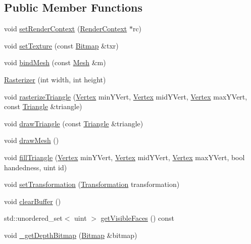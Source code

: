 \subsection*{Public Member Functions}
\begin{DoxyCompactItemize}
\item 
void \hyperlink{class_rasterizer_accac2d0878675f9fe01ae2fedd30f84f}{set\+Render\+Context} (\hyperlink{class_render_context}{Render\+Context} $\ast$rc)
\item 
void \hyperlink{class_rasterizer_a401966b0d0572d8c944e6b319515ac5e}{set\+Texture} (const \hyperlink{class_bitmap}{Bitmap} \&txr)
\item 
void \hyperlink{class_rasterizer_a4e43391ca21604f52d4baabc44b34933}{bind\+Mesh} (const \hyperlink{class_mesh}{Mesh} \&m)
\item 
\hyperlink{class_rasterizer_a2eec0e17ef479f0e0af5640d6786e077}{Rasterizer} (int width, int height)
\item 
void \hyperlink{class_rasterizer_a39a7b6f424f2bc8e7111892cbf387509}{rasterize\+Triangle} (\hyperlink{struct_vertex}{Vertex} min\+Y\+Vert, \hyperlink{struct_vertex}{Vertex} mid\+Y\+Vert, \hyperlink{struct_vertex}{Vertex} max\+Y\+Vert, const \hyperlink{struct_triangle}{Triangle} \&triangle)
\item 
void \hyperlink{class_rasterizer_a3be827df6aeec982f2a1e5106ee6e99b}{draw\+Triangle} (const \hyperlink{struct_triangle}{Triangle} \&triangle)
\item 
void \hyperlink{class_rasterizer_ab2d26833e9b47e3e1a1b9e94a77d0a18}{draw\+Mesh} ()
\item 
void \hyperlink{class_rasterizer_adcecbd138ae8c58d583037467f77ea35}{fill\+Triangle} (\hyperlink{struct_vertex}{Vertex} min\+Y\+Vert, \hyperlink{struct_vertex}{Vertex} mid\+Y\+Vert, \hyperlink{struct_vertex}{Vertex} max\+Y\+Vert, bool handedness, uint id)
\item 
void \hyperlink{class_rasterizer_ad18b358f6db3c9d0304feb402d37689e}{set\+Transformation} (\hyperlink{class_transformation}{Transformation} transformation)
\item 
void \hyperlink{class_rasterizer_a32023cfe311be2b5118912364a1d2219}{clear\+Buffer} ()
\item 
std\+::unordered\+\_\+set$<$ uint $>$ \hyperlink{class_rasterizer_a53689efa323cb4c5a9df0d4e5b19008f}{get\+Visible\+Faces} () const 
\item 
void \hyperlink{class_rasterizer_a75040e8d77887db53f23f3fccf9eace7}{\+\_\+get\+Depth\+Bitmap} (\hyperlink{class_bitmap}{Bitmap} \&bitmap)
\end{DoxyCompactItemize}

